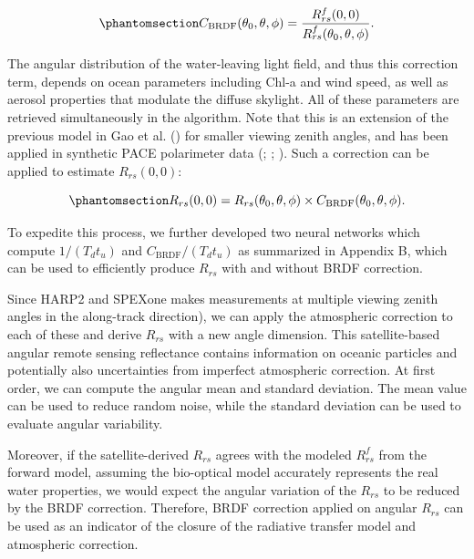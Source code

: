 \documentclass[
  11pt,
  letterpaper,
]{scrreprt}
\begin{document}
\begin{equation}\phantomsection\label{eq-cbrdf}{
C_{\mathrm{BRDF}}(\theta_0,\theta,\phi)
=
\frac{R^f_{rs}(0,0)}
{R^f_{rs}(\theta_0,\theta,\phi)}.
}\end{equation}

The angular distribution of the water-leaving light field, and thus this
correction term, depends on ocean parameters including Chl-a and wind
speed, as well as aerosol properties that modulate the diffuse skylight.
All of these parameters are retrieved simultaneously in the algorithm.
Note that this is an extension of the previous model in Gao et al.
() for smaller viewing zenith angles, and
has been applied in synthetic PACE polarimeter data
(;
;
). Such a correction can
be applied to estimate \(R_{rs}(0,0)\):

\begin{equation}\phantomsection\label{eq-rrs00}{
R_{rs}(0,0)
=
R_{rs}(\theta_0,\theta,\phi)
\times
C_{\mathrm{BRDF}}(\theta_0,\theta,\phi).
}\end{equation}

To expedite this process, we further developed two neural networks which
compute \(1/(T_d t_u)\) and \(C_{\mathrm{BRDF}}/(T_d t_u)\) as
summarized in Appendix B, which can be used to efficiently produce
\(R_{rs}\) with and without BRDF correction.

Since HARP2 and SPEXone makes measurements at multiple viewing zenith
angles in the along-track direction), we can apply the atmospheric
correction to each of these and derive \(R_{rs}\) with a new angle
dimension. This satellite-based angular remote sensing reflectance
contains information on oceanic particles and potentially also
uncertainties from imperfect atmospheric correction. At first order, we
can compute the angular mean and standard deviation. The mean value can
be used to reduce random noise, while the standard deviation can be used
to evaluate angular variability.

Moreover, if the satellite-derived \(R_{rs}\) agrees with the modeled
\(R^f_{rs}\) from the forward model, assuming the bio-optical model
accurately represents the real water properties, we would expect the
angular variation of the \(R_{rs}\) to be reduced by the BRDF
correction. Therefore, BRDF correction applied on angular \(R_{rs}\) can
be used as an indicator of the closure of the radiative transfer model
and atmospheric correction.
\end{document}
